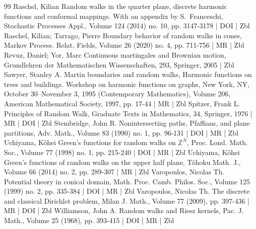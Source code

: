 \documentclass[10pt]{amsart}
\theoremstyle{definition}\newtheorem{defi}[theo]{Definition}\newtheorem{rema}[theo]{Remark}\newtheorem{exam}[theo]{Example}\newtheorem{exem}[theo]{Example}\newtheorem{nota}[theo]{Notation}
\begin{document}
\begin{thebibliography}{99}
Raschel, Kilian Random walks in the quarter plane, discrete harmonic functions and conformal mappings. With an appendix by S. Franceschi, Stochastic Processes Appl., Volume 124 (2014) no. 10, pp. 3147-3178 | DOI | Zbl
Raschel, Kilian; Tarrago, Pierre Boundary behavior of random walks in cones, Markov Process. Relat. Fields, Volume 26 (2020) no. 4, pp. 711-756 | MR | Zbl
Revuz, Daniel; Yor, Marc Continuous martingales and Brownian motion, Grundlehren der Mathematischen Wissenschaften, 293, Springer, 2005 | Zbl
Sawyer, Stanley A. Martin boundaries and random walks, Harmonic functions on trees and buildings. Workshop on harmonic functions on graphs, New York, NY, October 30–November 3, 1995 (Contemporary Mathematics), Volume 206, American Mathematical Society, 1997, pp. 17-44 | MR | Zbl
Spitzer, Frank L. Principles of Random Walk, Graduate Texts in Mathematics, 34, Springer, 1976 | MR | DOI | Zbl
Stembridge, John R. Nonintersecting paths, Pfaffians, and plane partitions, Adv. Math., Volume 83 (1990) no. 1, pp. 96-131 | DOI | MR | Zbl
Uchiyama, Kôhei Green’s functions for random walks on $\mathbb{Z}^{N}$, Proc. Lond. Math. Soc., Volume 77 (1998) no. 1, pp. 215-240 | DOI | MR | Zbl
Uchiyama, Kôhei Green’s functions of random walks on the upper half plane, Tôhoku Math. J., Volume 66 (2014) no. 2, pp. 289-307 | MR | Zbl
Varopoulos, Nicolas Th. Potential theory in conical domain, Math. Proc. Camb. Philos. Soc., Volume 125 (1999) no. 2, pp. 335-384 | DOI | MR | Zbl
Varopoulos, Nicolas Th. The discrete and classical Dirichlet problem, Milan J. Math., Volume 77 (2009), pp. 397-436 | MR | DOI | Zbl
Williamson, John A. Random walks and Riesz kernels, Pac. J. Math., Volume 25 (1968), pp. 393-415 | DOI | MR | Zbl
\end{thebibliography}
\end{document}
